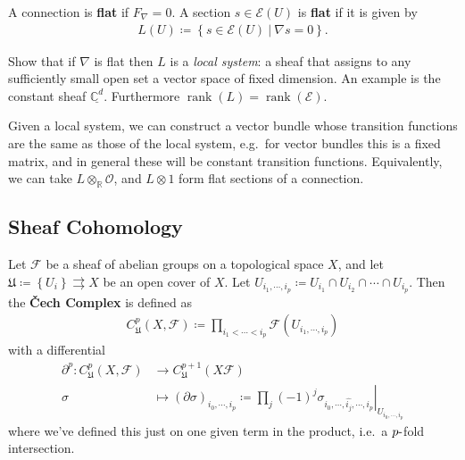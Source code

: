 \begin{definition}

A connection is \textbf{flat} if \(F_\nabla = 0\). A section
\(s \in \mathcal{E}(U)\) is \textbf{flat} if it is given by
\begin{align*}
L(U) \coloneqq\left\{{ s\in \mathcal{E}(U) {~\mathrel{\Big|}~}\nabla s = 0}\right\}
.\end{align*}

\end{definition}

\begin{exercise}[?]

Show that if \(\nabla\) is flat then \(L\) is a \emph{local system}: a
sheaf that assigns to any sufficiently small open set a vector space of
fixed dimension. An example is the constant sheaf
\(\underline{{\mathbb{C}}^d}\). Furthermore
\({\operatorname{rank}}(L) = {\operatorname{rank}}(\mathcal{E})\).

\end{exercise}

\begin{remark}

Given a local system, we can construct a vector bundle whose transition
functions are the same as those of the local system, e.g.~for vector
bundles this is a fixed matrix, and in general these will be constant
transition functions. Equivalently, we can take
\(L\otimes_{\mathbb{R}}{\mathcal{O}}\), and \(L\otimes 1\) form flat
sections of a connection.

\end{remark}

\hypertarget{sheaf-cohomology}{%
\subsection{Sheaf Cohomology}\label{sheaf-cohomology}}

\begin{definition}[?]

Let \(\mathcal{F}\) be a sheaf of abelian groups on a topological space
\(X\), and let
\(\mathfrak{U} \coloneqq\left\{{U_i}\right\} \rightrightarrows X\) be an
open cover of \(X\). Let
\(U_{i_1, \cdots, i_p} \coloneqq U_{i_1} \cap U_{i_2} \cap\cdots \cap U_{i_p}\).
Then the \textbf{Čech Complex} is defined as
\begin{align*}
C_{\mathfrak{U}}^p(X, \mathcal{F}) \coloneqq\prod_{i_1 < \cdots < i_p} \mathcal{F}(U_{i_1, \cdots, i_p})   
\end{align*}
with a differential
\begin{align*}
{{\partial}}^p: C_{\mathfrak{U}}^p(X, \mathcal{F}) &\to C_{\mathfrak{U}}^{p+1}(X \mathcal{F}) \\
\sigma &\mapsto ({{\partial}}\sigma)_{i_0, \cdots, i_p} \coloneqq\prod_j (-1)^j { \left.{{\sigma_{i_0, \cdots, \widehat{i_j}, \cdots, i_p}}} \right|_{{U_{i_0, \cdots, i_p}}} }
\end{align*}
where we've defined this just on one given term in the product, i.e.~a
\(p{\hbox{-}}\)fold intersection.

\end{definition}

